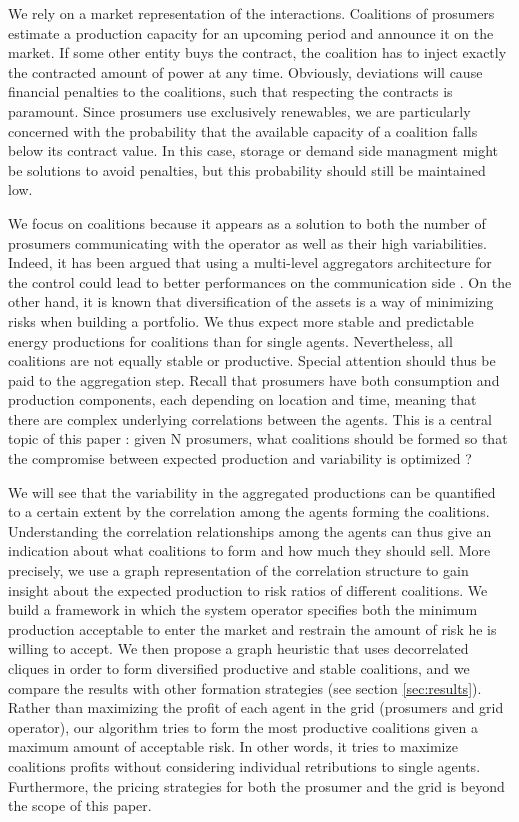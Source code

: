 \documentclass[journal]{IEEEtran}
\begin{document}
We rely on a market representation of the interactions. Coalitions of prosumers estimate a production capacity for an upcoming period and announce it on the market. If some other entity buys the contract, the coalition has to inject exactly the contracted amount of power at any time. Obviously, deviations will cause financial penalties to the coalitions, such that respecting the contracts is paramount. Since prosumers use exclusively renewables, we are particularly concerned with the probability that the available capacity of a coalition falls below its contract value. In this case, storage or demand side managment might be solutions to avoid penalties, but this probability should still be maintained low.

We focus on coalitions because it appears as a solution to both the number of prosumers communicating with the operator as well as their high variabilities. Indeed, it has been argued that using a multi-level aggregators architecture for the control could lead to better performances on the communication side \cite{Negeri2012}. On the other hand, it is known that diversification of the assets is a way of minimizing risks when building a portfolio. We thus expect more stable and predictable energy productions for coalitions than for single agents. Nevertheless, all coalitions are not equally stable or productive. Special attention should thus be paid to the aggregation step. Recall that prosumers have both consumption and production components, each depending on location and time, meaning that there are complex underlying correlations between the agents. This is a central topic of this paper : given N prosumers, what coalitions should be formed so that the compromise between expected production and variability is optimized ?

We will see that the variability in the aggregated productions can be quantified to a certain extent by the correlation among the agents forming the coalitions. Understanding the correlation relationships among the agents can thus give an indication about what coalitions to form and how much they should sell. More precisely, we use a graph representation of the correlation structure to gain insight about the expected production to risk ratios of different coalitions. We build a framework in which the system operator specifies both the minimum production acceptable to enter the market and restrain the amount of risk he is willing to accept. We then propose a graph heuristic that uses decorrelated cliques in order to form diversified productive and stable coalitions, and we compare the results with other formation strategies (see section \ref{sec:results}). Rather than maximizing the profit of each agent in the grid (prosumers and grid operator), our algorithm tries to form the most productive coalitions given a maximum amount of acceptable risk. In other words, it tries to maximize coalitions profits without considering individual retributions to single agents. Furthermore, the pricing strategies for both the prosumer and the grid is beyond the scope of this paper.  
\end{document}

